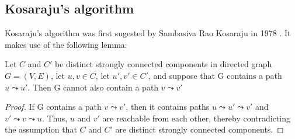 \subsection{Kosaraju's algorithm} \label{algorithm-scc-kosaraju}
Kosaraju's algorithm was first sugested by Sambasiva Rao Kosaraju in 1978 \cite{intro-alg}. It makes use of the following lemma:
\begin{lemma} \label{lem:kosaraju1}
    Let $C$ and $C'$ be distinct strongly connected components in directed graph $G=(V,E)$, let $u,v \in C$, let $u',v' \in C'$, and suppose that G contains a path $u \leadsto u'$. Then G cannot also contain a path $v \leadsto v'$
\end{lemma}
\begin{proof}
    If G contains a path $v \leadsto v'$, then it contains paths $u \leadsto u' \leadsto v'$ and $v' \leadsto v \leadsto u$. Thus, $u$ and $v'$ are reachable from each other, thereby contradicting the assumption that $C$ and $C'$ are distinct strongly connected components.
\end{proof}

